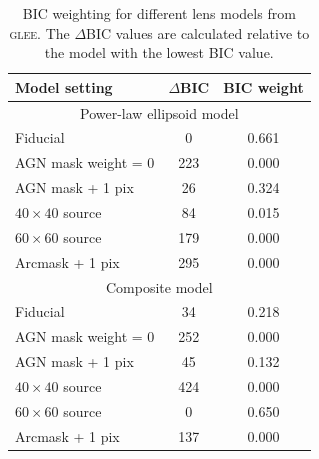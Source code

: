 \documentclass[longauth]{aa}
\newcommand{\ajsiv}[1]{{{#1}}}
\begin{document}


\renewcommand*\arraystretch{1.5}
\begin{table}
\caption{BIC weighting for different lens models \ajsiv{from \textsc{glee}. The $\Delta$BIC values are calculated relative to the model with the lowest BIC value.} \label{tab:glee_td_bic}}
\begin{minipage}{\linewidth}
\begin{tabular}{lcc}
\hline
Model setting &
$\Delta$BIC &
BIC weight \\
\hline
\multicolumn{3}{c}{Power-law ellipsoid model} \\
\hline
Fiducial &
0 &
0.661
\\
AGN mask weight = 0 &
223 &
0.000
\\
AGN mask + 1 pix &
26 &
0.324
\\
$40\times40$ source &
84 &
0.015
\\
$60\times60$ source &
179 &
0.000
\\
Arcmask + 1 pix &
295 &
0.000
\\
\hline
\multicolumn{3}{c}{Composite model} \\
\hline
Fiducial &
34 &
0.218
\\
AGN mask weight = 0 &
252 &
0.000
\\
AGN mask + 1 pix &
45 &
0.132
\\
$40\times40$ source &
424 &
0.000
\\
$60\times60$ source &
0 &
0.650
\\
Arcmask + 1 pix &
137 &
0.000
\\
\hline
\end{tabular}
\\
\end{minipage}
\end{table}
\renewcommand*\arraystretch{1.0}
\end{document}
